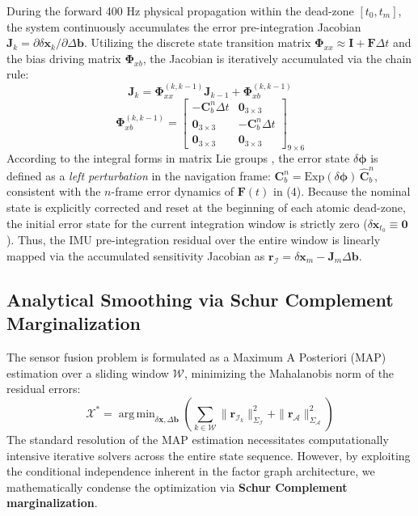 \documentclass[journal]{IEEEtran}
\DeclareMathOperator*{\argmin}{arg\,min}
\newcommand{\Exp}{\mathrm{Exp}}
\begin{document}
	During the forward 400 Hz physical propagation within the dead-zone $[t_0, t_m]$, the system continuously accumulates the error pre-integration Jacobian $\bm{J}_k = \partial \delta \bm{x}_k / \partial \Delta \bm{b}$. Utilizing the discrete state transition matrix $\bm{\Phi}_{xx} \approx \bm{I} + \bm{F} \Delta t$ and the bias driving matrix $\bm{\Phi}_{xb}$, the Jacobian is iteratively accumulated via the chain rule:
	\begin{equation}
		\bm{J}_k = \bm{\Phi}_{xx}^{(k, k-1)} \bm{J}_{k-1} + \bm{\Phi}_{xb}^{(k, k-1)}
	\end{equation}
	\begin{equation}
		\bm{\Phi}_{xb}^{(k, k-1)} = 
		\begin{bmatrix}
			-\bm{C}_b^n \Delta t & \bm{0}_{3\times3} \\
			\bm{0}_{3\times3} & -\bm{C}_b^n \Delta t \\
			\bm{0}_{3\times3} & \bm{0}_{3\times3}
		\end{bmatrix}_{9 \times 6}
	\end{equation}
	According to the integral forms in matrix Lie groups \cite{b5, b56}, the error state $\delta \bm{\phi}$ is defined as a \textit{left perturbation} in the navigation frame: $\bm{C}_b^n = \Exp(\delta \bm{\phi})\,\hat{\bm{C}}_b^n$, consistent with the $n$-frame error dynamics of $\bm{F}(t)$ in (4). Because the nominal state is explicitly corrected and reset at the beginning of each atomic dead-zone, the initial error state for the current integration window is strictly zero ($\delta \bm{x}_{t_0} \equiv \bm{0}$). Thus, the IMU pre-integration residual over the entire window is linearly mapped via the accumulated sensitivity Jacobian as $\bm{r}_{\mathcal{I}} = \delta \bm{x}_m - \bm{J}_m \Delta \bm{b}$.
	
	\subsection{Analytical Smoothing via Schur Complement Marginalization}
	The sensor fusion problem is formulated as a Maximum A Posteriori (MAP) estimation over a sliding window $\mathcal{W}$, minimizing the Mahalanobis norm of the residual errors:
	\begin{equation}
		\mathcal{X}^* = \argmin_{\delta \bm{x}, \Delta \bm{b}} \left( \sum_{k \in \mathcal{W}} \| \bm{r}_{\mathcal{I}_k} \|^2_{\Sigma_{\mathcal{I}}} + \| \bm{r}_{\mathcal{A}} \|^2_{\Sigma_{\mathcal{A}}} \right)
	\end{equation}
	The standard resolution of the MAP estimation necessitates computationally intensive iterative solvers across the entire state sequence. However, by exploiting the conditional independence inherent in the factor graph architecture, we mathematically condense the optimization via \textbf{Schur Complement marginalization}.
	
\end{document}
